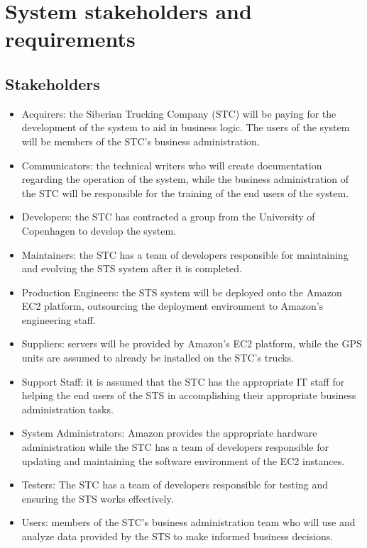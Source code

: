 \documentclass[a4paper,11pt]{report}
\begin{document}
\chapter{System stakeholders and requirements}
\label{cha:syst-stak-requ}
\thispagestyle{fancy}

\section{Stakeholders}
\label{sec:stakeholders}

\begin{itemize}
  \item Acquirers: the Siberian Trucking Company (STC) will be paying for the
    development of the system to aid in business logic. The users of the system
    will be members of the STC's business administration.
  \item Communicators: the technical writers who will create documentation regarding the
    operation of the system, while the business administration of the STC will
    be responsible for the training of the end users of the system.
  \item Developers: the STC has contracted a group from the University of
    Copenhagen to develop the system.
  \item Maintainers: the STC has a team of developers responsible for
    maintaining and evolving the STS system after it is completed.
  \item Production Engineers: the STS system will be deployed onto the Amazon
    EC2 platform, outsourcing the deployment environment to Amazon's
    engineering staff.
  \item Suppliers: servers will be provided by Amazon's EC2 platform, while the
    GPS units are assumed to already be installed on the STC's trucks.
  \item Support Staff: it is assumed that the STC has the appropriate IT staff
    for helping the end users of the STS in accomplishing their appropriate
    business administration tasks.
  \item System Administrators: Amazon provides the appropriate hardware
    administration while the STC has a team of developers responsible for
    updating and maintaining the software environment of the EC2 instances.
  \item Testers: The STC has a team of developers responsible for testing and
    ensuring the STS works effectively.
  \item Users: members of the STC's business administration team who will use
    and analyze data provided by the STS to make informed business decisions.
\end{itemize}
\end{document}
